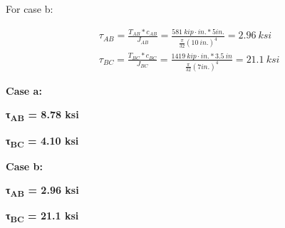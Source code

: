 \documentclass[
  letterpaper,
  DIV=11,
  numbers=noendperiod]{scrreprt}
\theoremstyle{definition}
\theoremstyle{remark}
\begin{document}
\begin{tcolorbox}
\begin{tcolorbox}
For case b:

\[
\begin{aligned}
& \tau_{AB}=\frac{T_{AB}*c_{AB}}{J_{AB}}=\frac{581{~kip}\cdot{in.}*5{in.}}{\frac{\pi}{32}(10{~in.})^4}=2.96{~ksi} \\
& \tau_{BC}=\frac{T_{BC}*c_{BC}}{J_{BC}}=\frac{1419{~kip}\cdot{in.}*3.5{~in}}{\frac{\pi}{32}(7{in.})^4}=21.1{~ksi}
\end{aligned}
\]

\textbf{Case a:}

\textbf{τ\textsubscript{AB} = 8.78 ksi}

\textbf{τ\textsubscript{BC} = 4.10 ksi}

\textbf{Case b:}

\textbf{τ\textsubscript{AB} = 2.96 ksi}

\textbf{τ\textsubscript{BC} = 21.1 ksi}

\end{tcolorbox}

\end{tcolorbox}
\end{document}
